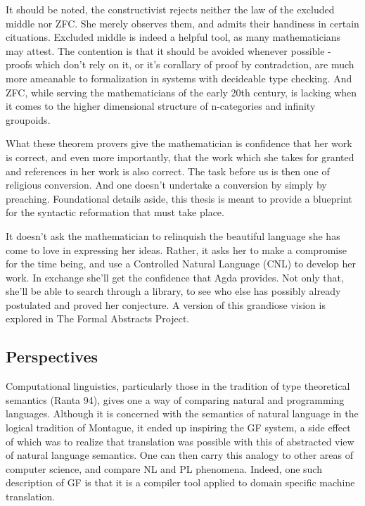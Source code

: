 \documentclass[11pt, a4paper]{article}
\begin{document}
It should be noted, the constructivist rejects neither the law of the excluded
middle nor ZFC. She merely observes them, and admits their handiness in certain
cituations. Excluded middle is indeed a helpful tool, as many mathematicians may
attest. The contention is that it should be avoided whenever possible - proofs
which don't rely on it, or it's corallary of proof by contradction, are much
more ameanable to formalization in systems with decideable type checking. And
ZFC, while serving the mathematicians of the early 20th century, is lacking when
it comes to the higher dimensional structure of n-categories and infinity
groupoids.

What these theorem provers give the mathematician is confidence that her work is
correct, and even more importantly, that the work which she takes for granted
and references in her work is also correct. The task before us is then one of
religious conversion. And one doesn't undertake a conversion by simply by
preaching. Foundational details aside, this thesis is meant to provide a
blueprint for the syntactic reformation that must take place.

It doesn't ask the mathematician to relinquish the beautiful language she has
come to love in expressing her ideas. Rather, it asks her to make a compromise
for the time being, and use a Controlled Natural Language (CNL) to develop her
work. In exchange she'll get the confidence that Agda provides. Not only that,
she'll be able to search through a library, to see who else has possibly already
postulated and proved her conjecture. A version of this grandiose vision is
explored in The Formal Abstracts Project.

\subsection{Perspectives}


Computational linguistics, particularly those in the tradition of type
theoretical semantics (Ranta 94), gives one a way of comparing natural and
programming languages. Although it is concerned with the semantics of natural
language in the logical tradition of Montague, it ended up inspiring the GF
system, a side effect of which was to realize that translation was possible with
this of abstracted view of natural language semantics. One can then carry this
analogy to other areas of computer science, and compare NL and PL phenomena.
Indeed, one such description of GF is that it is a compiler tool applied to
domain specific machine translation.
\end{document}
